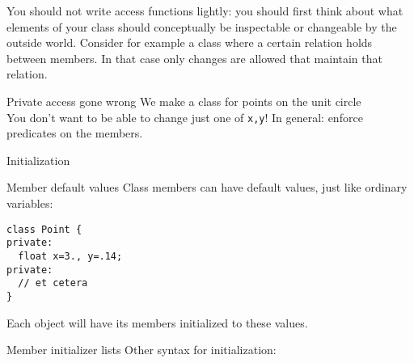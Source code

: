 You should not write access functions lightly: you should first think
about what elements of your class should conceptually be inspectable
or changeable by the outside world.  Consider for example a class
where a certain relation holds between members. In that case only
changes are allowed that maintain that relation.

\begin{block}{Private access gone wrong}
  \label{sl:privatenogood}
  We make a class for points on the unit circle\\
  You don't want to be able to change just one of \lstinline{x,y}!
  In general: enforce predicates on the members.
\end{block}

\begin{comment}
  In the first example above, the data members of the \lstinline{Vector} class were
  declared \lstinline{public}, meaning that they are accessable from the calling
  (main) program. While this is initially convenient for coding, it is a bad idea
  in the long term. For a variety of reasons it is good practice to
  separate interface and implementation of a class.

  \begin{block}{Example of accessor functions}
    \label{sl:pointaccess}
    Getting and setting of members values is done through accessor functions:
    \begin{multicols}{2}
      \verbatimsnippet{pointprivate}
      \verbatimsnippet{pointprivateset}
      \verbatimsnippet{pointprivateclose}
      \verbatimsnippet{pointprivatedefine}
    \end{multicols}
    Usage:
    \verbatimsnippet{pointprivatesetuse}
  \end{block}
\end{comment}

 {Initialization}

\begin{block}{Member default values}
  \label{sl:class-defval}
  Class members can have default values, just like ordinary variables:
\begin{lstlisting}
class Point {
private:
  float x=3., y=.14;
private:
  // et cetera
}
\end{lstlisting}
  Each object will have its members initialized to these values.
\end{block}

\begin{block}{Member initializer lists}
  \label{sl:class-init}
  Other syntax for initialization:
\end{block}

